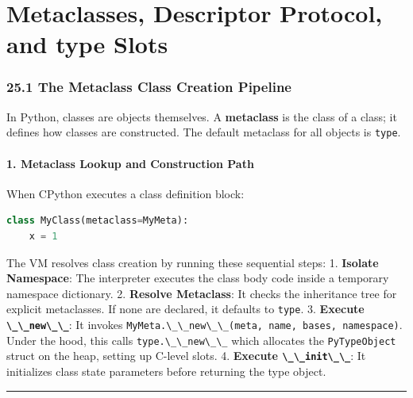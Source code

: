 \hypertarget{metaclasses-descriptor-protocol-and-type-slots}{%
\chapter{Metaclasses, Descriptor Protocol, and type
Slots}\label{metaclasses-descriptor-protocol-and-type-slots}}

\hypertarget{the-metaclass-class-creation-pipeline}{%
\subsection{25.1 The Metaclass Class Creation
Pipeline}\label{the-metaclass-class-creation-pipeline}}

In Python, classes are objects themselves. A \textbf{metaclass} is the
class of a class; it defines how classes are constructed. The default
metaclass for all objects is \passthrough{\lstinline!type!}.

\hypertarget{metaclass-lookup-and-construction-path}{%
\subsubsection{1. Metaclass Lookup and Construction
Path}\label{metaclass-lookup-and-construction-path}}

When CPython executes a class definition block:

\begin{lstlisting}[language=Python]
class MyClass(metaclass=MyMeta):
    x = 1
\end{lstlisting}

The VM resolves class creation by running these sequential steps: 1.
\textbf{Isolate Namespace}: The interpreter executes the class body code
inside a temporary namespace dictionary. 2. \textbf{Resolve Metaclass}:
It checks the inheritance tree for explicit metaclasses. If none are
declared, it defaults to \passthrough{\lstinline!type!}. 3.
\textbf{Execute \passthrough{\lstinline!\_\_new\_\_!}}: It invokes
\passthrough{\lstinline!MyMeta.\_\_new\_\_(meta, name, bases, namespace)!}.
Under the hood, this calls \passthrough{\lstinline!type.\_\_new\_\_!}
which allocates the \passthrough{\lstinline!PyTypeObject!} struct on the
heap, setting up C-level slots. 4. \textbf{Execute
\passthrough{\lstinline!\_\_init\_\_!}}: It initializes class state
parameters before returning the type object.

\begin{center}\rule{0.5\linewidth}{0.5pt}\end{center}

